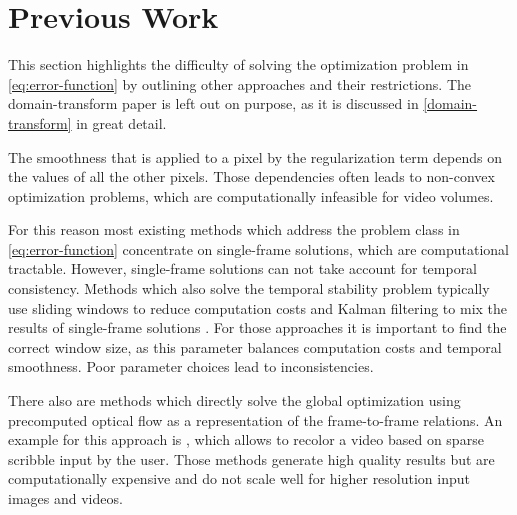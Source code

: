 \section{Previous Work}
This section highlights the difficulty of solving the optimization problem in
\autoref{eq:error-function} by outlining other approaches and their
restrictions. The domain-transform paper
\cite{GastalOliveira2011DomainTransform} is left out on purpose, as it is
discussed in \autoref{domain-transform} in great detail.

The smoothness that is applied to a pixel by the regularization term depends on
the values of all the other pixels. Those dependencies often leads to non-convex
optimization problems, which are computationally infeasible for video volumes.

For this reason most existing methods which address the problem class in
\autoref{eq:error-function} concentrate on single-frame solutions, which are
computational tractable. However, single-frame solutions can not take account
for temporal consistency. Methods which also solve the temporal stability
problem typically use sliding windows to reduce computation costs
\cite{conf/psivt/HosniRBG11} and Kalman filtering to mix the results of
single-frame solutions \cite{conf/acivs/HoffkenOK11}. For those approaches it is
important to find the correct window size, as this parameter balances
computation costs and temporal smoothness. Poor parameter choices lead to
inconsistencies.

There also are methods which directly solve the global optimization using
precomputed optical flow as a representation of the frame-to-frame relations. An
example for this approach is \cite{Levin:2004:CUO:1015706.1015780}, which allows
to recolor a video based on sparse scribble input by the user. Those methods
generate high quality results but are computationally expensive and do not scale
well for higher resolution input images and videos.

